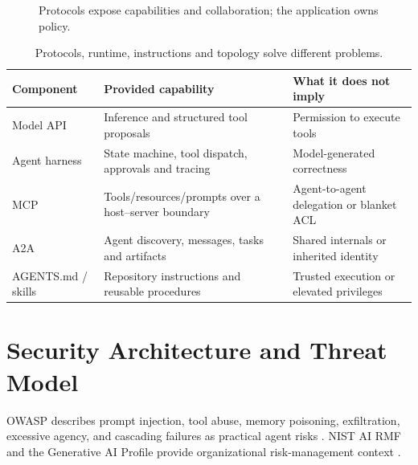 \begin{figure}[htbp]\centering
{}
\caption{Protocols expose capabilities and collaboration; the application owns policy.}
\label{fig:interoperability}
\end{figure}

\begin{table}[htbp]\small\centering
\begin{tabularx}{\linewidth}{@{}p{23mm}Y Y@{}}\toprule
\textbf{Component} & \textbf{Provided capability} & \textbf{What it does not imply}\\\midrule
Model API & Inference and structured tool proposals & Permission to execute tools\\
Agent harness & State machine, tool dispatch, approvals and tracing & Model-generated correctness\\
MCP & Tools/resources/prompts over a host--server boundary & Agent-to-agent delegation or blanket ACL\\
A2A & Agent discovery, messages, tasks and artifacts & Shared internals or inherited identity\\
AGENTS.md / skills & Repository instructions and reusable procedures & Trusted execution or elevated privileges\\\bottomrule
\end{tabularx}
\caption{Protocols, runtime, instructions and topology solve different problems.}
\end{table}

\section{Security Architecture and Threat Model}
OWASP describes prompt injection, tool abuse, memory poisoning, exfiltration, excessive agency, and cascading failures as practical agent risks \cite{owasp}. NIST AI RMF and the Generative AI Profile provide organizational risk-management context \cite{nist,nistgenai}.

